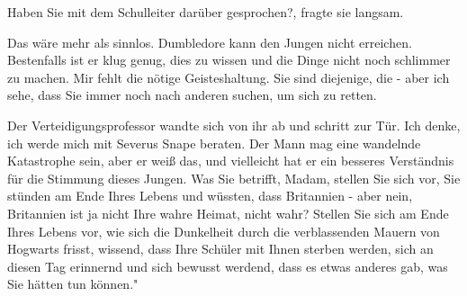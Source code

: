 \glqq{}Haben Sie mit dem Schulleiter darüber gesprochen?\grqq{}, fragte sie
langsam.

\glqq{}Das wäre mehr als sinnlos. Dumbledore kann den Jungen nicht erreichen.
Bestenfalls ist er klug genug, dies zu wissen und die Dinge nicht noch schlimmer
zu machen. Mir fehlt die nötige Geisteshaltung. Sie sind diejenige, die - aber
ich sehe, dass Sie immer noch nach anderen suchen, um sich zu retten.\grqq{}

Der Verteidigungsprofessor wandte sich von ihr ab und schritt zur Tür. \glqq{}Ich
denke, ich werde mich mit Severus Snape beraten. Der Mann mag eine wandelnde
Katastrophe sein, aber er weiß das, und vielleicht hat er ein besseres
Verständnis für die Stimmung dieses Jungen. Was Sie betrifft, Madam, stellen Sie
sich vor, Sie stünden am Ende Ihres Lebens und wüssten, dass Britannien - aber
nein, Britannien ist ja nicht Ihre wahre Heimat, nicht wahr? Stellen Sie sich am
Ende Ihres Lebens vor, wie sich die Dunkelheit durch die verblassenden Mauern
von Hogwarts frisst, wissend, dass Ihre Schüler mit Ihnen sterben werden, sich
an diesen Tag erinnernd und sich bewusst werdend, dass es etwas anderes gab, was
Sie hätten tun können."

